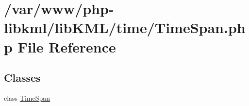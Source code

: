 \hypertarget{TimeSpan_8php}{
\section{/var/www/php-\/libkml/libKML/time/TimeSpan.php File Reference}
\label{de/d14/TimeSpan_8php}
}
\subsection*{Classes}
\begin{DoxyCompactItemize}
\item 
class \hyperlink{classTimeSpan}{TimeSpan}
\end{DoxyCompactItemize}
